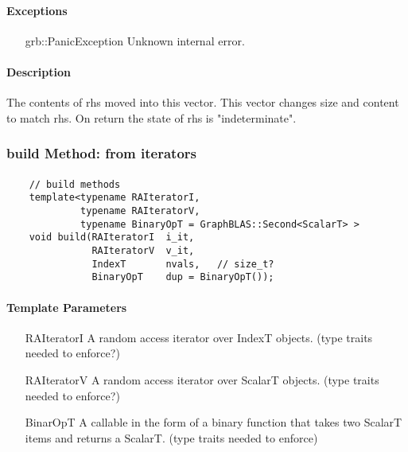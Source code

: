 \paragraph{Exceptions}

\begin{itemize}[leftmargin=2.1in]
    \item[{\sf grb::PanicException}]   Unknown internal error.
\end{itemize}

\paragraph{Description}

The contents of {\sf rhs} moved into this vector.  This vector changes size and content to match {\sf rhs}.
On return the state of {\sf rhs} is "indeterminate".


\subsubsection{{\sf build} Method: from iterators}


\paragraph{\syntax}

\begin{verbatim}
    // build methods
    template<typename RAIteratorI,
             typename RAIteratorV,
             typename BinaryOpT = GraphBLAS::Second<ScalarT> >
    void build(RAIteratorI  i_it,
               RAIteratorV  v_it,
               IndexT       nvals,   // size_t?
               BinaryOpT    dup = BinaryOpT());
\end{verbatim}

\paragraph{Template Parameters}

\begin{itemize}[leftmargin=1.1in]
    \item[{\sf RAIteratorI}] A random access iterator over IndexT objects.  (type traits needed to enforce?)
    \item[{\sf RAIteratorV}] A random access iterator over ScalarT objects.  (type traits needed to enforce?)
    \item[{\sf BinarOpT}]    A callable in the form of a binary function
                             that takes two ScalarT items and returns a ScalarT. (type traits needed to enforce)
\end{itemize}

